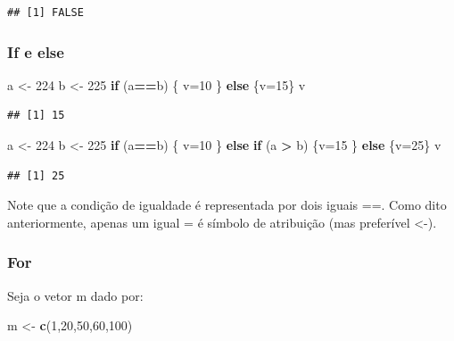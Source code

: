 \documentclass[
]{book}
\newenvironment{Shaded}{\begin{snugshade}}{\end{snugshade}}
\newcommand{\ControlFlowTok}[1]{\textcolor[rgb]{0.13,0.29,0.53}{\textbf{#1}}}
\newcommand{\DecValTok}[1]{\textcolor[rgb]{0.00,0.00,0.81}{#1}}
\newcommand{\KeywordTok}[1]{\textcolor[rgb]{0.13,0.29,0.53}{\textbf{#1}}}
\newcommand{\NormalTok}[1]{#1}
\newcommand{\OperatorTok}[1]{\textcolor[rgb]{0.81,0.36,0.00}{\textbf{#1}}}
\newcommand{\StringTok}[1]{\textcolor[rgb]{0.31,0.60,0.02}{#1}}
\begin{document}
\begin{verbatim}
## [1] FALSE
\end{verbatim}

\hypertarget{if-e-else}{%
\subsubsection{If e else}\label{if-e-else}}

\begin{Shaded}
\begin{Highlighting}[]
\NormalTok{a <-}\StringTok{ }\DecValTok{224}
\NormalTok{b <-}\StringTok{ }\DecValTok{225}
\ControlFlowTok{if}\NormalTok{ (a}\OperatorTok{==}\NormalTok{b) \{ v=}\DecValTok{10}
\NormalTok{\} }\ControlFlowTok{else}\NormalTok{ \{v=}\DecValTok{15}\NormalTok{\}}
\NormalTok{v}
\end{Highlighting}
\end{Shaded}

\begin{verbatim}
## [1] 15
\end{verbatim}

\begin{Shaded}
\begin{Highlighting}[]
\NormalTok{a <-}\StringTok{ }\DecValTok{224}
\NormalTok{b <-}\StringTok{ }\DecValTok{225}
\ControlFlowTok{if}\NormalTok{ (a}\OperatorTok{==}\NormalTok{b) \{ v=}\DecValTok{10}
\NormalTok{\} }\ControlFlowTok{else} \ControlFlowTok{if}\NormalTok{ (a }\OperatorTok{>}\StringTok{ }\NormalTok{b) \{v=}\DecValTok{15}
\NormalTok{\} }\ControlFlowTok{else}\NormalTok{ \{v=}\DecValTok{25}\NormalTok{\}}
\NormalTok{v}
\end{Highlighting}
\end{Shaded}

\begin{verbatim}
## [1] 25
\end{verbatim}

Note que a condição de igualdade é representada por dois iguais ==. Como dito anteriormente, apenas um igual = é símbolo de atribuição (mas preferível \textless-).

\hypertarget{for}{%
\subsubsection{For}\label{for}}

Seja o vetor m dado por:

\begin{Shaded}
\begin{Highlighting}[]
\NormalTok{m <-}\StringTok{ }\KeywordTok{c}\NormalTok{(}\DecValTok{1}\NormalTok{,}\DecValTok{20}\NormalTok{,}\DecValTok{50}\NormalTok{,}\DecValTok{60}\NormalTok{,}\DecValTok{100}\NormalTok{)}
\end{Highlighting}
\end{Shaded}
\end{document}
